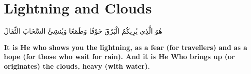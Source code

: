 \chapter{Lightning and Clouds}
\begin{center}
    {\Huge    
        \begin{Arabic}
            هُوَ الَّذِي يُرِيكُمُ الْبَرْقَ خَوْفًا وَطَمَعًا وَيُنشِئُ السَّحَابَ الثِّقَالَ
        \end{Arabic}
    }    
\end{center}
\vspace*{\fill}
\vspace{3cm}
\begin{center}
    \large \textbf{It is He who shows you the lightning, as a fear (for travellers) and as a hope (for those who wait for rain). And it is He Who brings up (or originates) the clouds, heavy (with water).}
\end{center}
